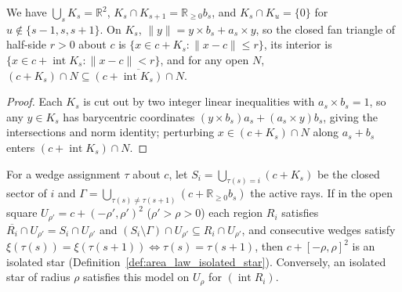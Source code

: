 \begin{lemma}
    \label{lem:area_law_repair_fan_cones}
    \leanok
    We have $\bigcup_s K_s=\mathbb R^2$, $K_s\cap K_{s+1}=\mathbb R_{\ge0}b_s$, and
    $K_s\cap K_u=\{0\}$ for $u\notin\{s-1,s,s+1\}$. On $K_s$, $\lVert y\rVert=y\times b_s+a_s\times y$,
    so the closed fan triangle of half-side $r>0$ about $c$ is $\{x\in c+K_s:\lVert x-c\rVert\le r\}$,
    its interior is $\{x\in c+\operatorname{int}K_s:\lVert x-c\rVert<r\}$, and for any open $N$,
    $(c+K_s)\cap N\subseteq\overline{(c+\operatorname{int}K_s)\cap N}$.
\end{lemma}

\begin{proof}
    \leanok
    Each $K_s$ is cut out by two integer linear inequalities with $a_s\times b_s=1$, so any
    $y\in K_s$ has barycentric coordinates $(y\times b_s)a_s+(a_s\times y)b_s$, giving the
    intersections and norm identity; perturbing $x\in(c+K_s)\cap N$ along $a_s+b_s$ enters
    $(c+\operatorname{int}K_s)\cap N$.
\end{proof}

\begin{lemma}
    \label{lem:area_law_star_local_model}
    \leanok
    For a wedge assignment $\tau$ about $c$, let $S_i=\bigcup_{\tau(s)=i}(c+K_s)$ be the closed
    sector of $i$ and $\Gamma=\bigcup_{\tau(s)\ne\tau(s+1)}(c+\mathbb R_{\ge0}b_s)$ the active rays.
    If in the open square $U_{\rho'}=c+(-\rho',\rho')^2$ ($\rho'>\rho>0$) each region $R_i$ satisfies
    $\overline{R_i}\cap U_{\rho'}=S_i\cap U_{\rho'}$ and $(S_i\setminus\Gamma)\cap U_{\rho'}\subseteq R_i\cap U_{\rho'}$,
    and consecutive wedges satisfy $\xi(\tau(s))=\xi(\tau(s+1))\iff\tau(s)=\tau(s+1)$, then
    $c+[-\rho,\rho]^2$ is an isolated star (Definition~\ref{def:area_law_isolated_star}).
    Conversely, an isolated star of radius $\rho$ satisfies this model on $U_\rho$ for $(\operatorname{int}R_i)$.
\end{lemma}

